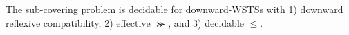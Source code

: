 \begin{theorem}\label{thm-dwsts}
The sub-covering problem is decidable for downward-WSTSs with 1) downward reflexive compatibility,  2) effective $\Succ$, and 3) decidable $\le$.
\end{theorem}



%



